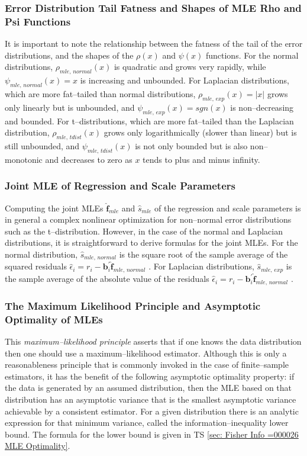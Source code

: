 \documentclass[graybox,envcountchap,sectrefs]{svmono}\usepackage[]{graphicx}\usepackage[]{xcolor}
\begin{document}
\begin{appendices}
\subsubsection*{Error Distribution Tail Fatness and Shapes of MLE Rho and Psi Functions}

It is important to note the relationship between the fatness of the
tail of the error distributions, and the shapes of the $\rho(x)$
and $\psi(x)$ functions. For the normal distributions, $\rho_{mle,\,normal}(x)$
is quadratic and grows very rapidly, while $\psi_{mle,\,normal}(x)=x$
is increasing and unbounded. For Laplacian distributions, which are
more fat--tailed than normal distributions, $\rho_{mle,\,exp}(x)=|x|$
grows only linearly but is unbounded, and $\psi_{mle,\,exp}(x)=sgn(x)$
is non--decreasing and bounded. For t--distributions, which are
more fat--tailed than the Laplacian distribution, $\rho_{mle,\,tdist}(x)$
grows only logarithmically (slower than linear) but is still unbounded,
and $\psi_{mle,\,tdist}(x)$ is not only bounded but is also non--monotonic
and decreases to zero as $x$ tends to plus and minus infinity.

\subsubsection*{Joint MLE of Regression and Scale Parameters}

Computing the joint MLEs $\hat{\mathbf{f}}_{mle}$ and $\hat{s}_{mle}$
of the regression and scale parameters is in general a complex nonlinear
optimization for non--normal error distributions such as the t--distribution.
However, in the case of the normal and Laplacian distributions, it
is straightforward to derive formulas for the joint MLEs. For the
normal distribution, $\hat{s}_{mle,\,normal}$ is the square root
of the sample average of the squared residuals $\hat{\epsilon}_{i}=r_{i}-\mathbf{b}_{i}^{\prime}\hat{\mathbf{f}}_{mle,\,normal}$
. For Laplacian distributions, $\hat{s}_{mle,\,exp}$ is the sample
average of the absolute value of the residuals $\hat{\epsilon}_{i}=r_{i}-\mathbf{b}_{i}^{\prime}\hat{\mathbf{f}}_{mle,\,normal}$
.

\subsubsection*{The Maximum Likelihood Principle and Asymptotic Optimality of MLEs}

This \emph{maximum--likelihood principle} asserts that if one knows
the data distribution then one should use a maximum--likelihood estimator.
Although this is only a reasonableness principle that is commonly
invoked in the case of finite--sample estimators, it has the benefit
of the following asymptotic optimality property: if the data is generated
by an assumed distribution, then the MLE based on that distribution
has an asymptotic variance that is the smallest asymptotic variance
achievable by a consistent estimator. For a given distribution there
is an analytic expression for that minimum variance, called the information--inequality
lower bound. The formula for the lower bound is given in TS \ref{sec: Fisher Info =000026 MLE Optimality}. 


\end{appendices}
\end{document}
